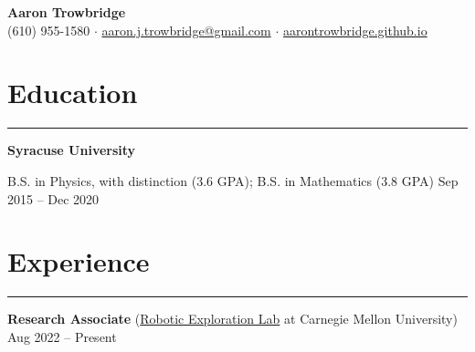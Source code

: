 \documentclass[9pt]{extarticle}
\newcommand{\myline}{\rule[\baselineskip]{\linewidth}{1pt}}
\begin{document}
\begin{center}
\Huge
\textbf{Aaron Trowbridge}\\

\normalsize
(610) 955-1580 $\cdot$ \href{mailto:aaron.j.trowbridge@gmail.com}{aaron.j.trowbridge@gmail.com} $\cdot$ \href{https://aarontrowbridge.github.io/}{aarontrowbridge.github.io} \\

\end{center}


\section{Education}

\myline


\large\textbf{Syracuse University} 
\vspace{7pt}

\normalsize
\begin{compactitem}
\setlength\itemsep{0em}
\item B.S. in Physics, with distinction (3.6 GPA); B.S. in Mathematics (3.8 GPA) \hfill \small Sep 2015 -- Dec 2020 

\end{compactitem}


\section{Experience}

\myline




\vspace{7pt}
\large\textbf{Research Associate} \normalsize (\href{https://roboticexplorationlab.org/}{Robotic Exploration Lab} at Carnegie Mellon University) \hfill \small Aug 2022 -- Present 
\normalsize
\end{document}
